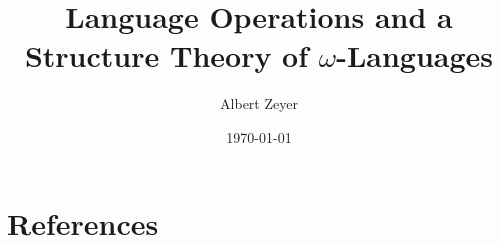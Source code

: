 \documentclass{article}
\begin{document}
\title{Language Operations and a Structure Theory of $\omega$-Languages}
\author{Albert Zeyer}
\date{\today}

\maketitle
\tableofcontents




%




\section{References}



\printindex
\end{document}
